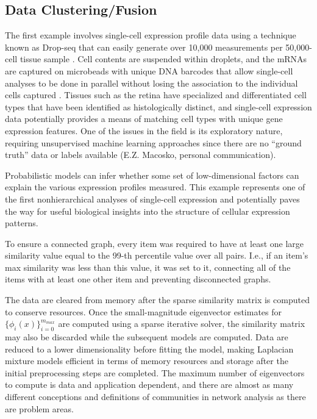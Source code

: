 \documentclass[10pt,letterpaper]{article}
\begin{document}
\subsection*{Data Clustering/Fusion}
The first example involves single-cell expression profile data using a technique known as Drop-seq that can easily generate over 10,000 measurements per 50,000-cell tissue sample \cite{dropseq}.
Cell contents are suspended within droplets, and the mRNAs are captured on microbeads with unique DNA barcodes that allow single-cell analyses to be done in parallel without losing the association to the individual cells captured \cite{dropseqrev}.
Tissues such as the retina have specialized and differentiated cell types that have been identified as histologically distinct, and single-cell expression data potentially provides a means of matching cell types with unique gene expression features.
One of the issues in the field is its exploratory nature, requiring unsupervised machine learning approaches since there are no ``ground truth'' data or labels available (E.Z. Macosko, personal communication).

Probabilistic models can infer whether some set of low-dimensional factors can explain the various expression profiles measured.
This example represents one of the first nonhierarchical analyses of single-cell expression and potentially paves the way for useful biological insights into the structure of cellular expression patterns.

To ensure a connected graph, every item was required to have at least one large similarity value equal to the 99-th percentile value over all pairs.
I.e., if an item's max similarity was less than this value, it was set to it, connecting all of the items with at least one other item and preventing disconnected graphs.

The data are cleared from memory after the sparse similarity matrix is computed to conserve resources.
Once the small-magnitude eigenvector estimates for $\{\phi_i(x)\}_{i = 0}^{m_{max}}$ are computed using a sparse iterative solver, the similarity matrix may also be discarded while the subsequent models are computed.
Data are reduced to a lower dimensionality before fitting the model, making Laplacian mixture models efficient in terms of memory resources and storage after the initial preprocessing steps are completed.
The maximum number of eigenvectors to compute is data and application dependent, and there are almost as many different conceptions and definitions of communities in network analysis as there are problem areas.
\end{document}
